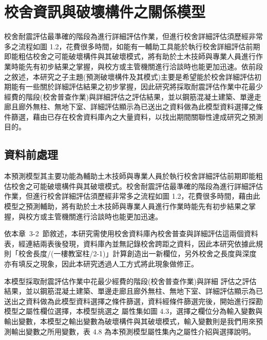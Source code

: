 \renewcommand\thetable{\arabic{chapter}-\arabic{table}}
\chapter{校舍資訊與破壞構件之關係模型}

校舍耐震評估最準確的階段為進行詳細評估作業，但進行校舍詳細評估須歷經非常多之流程如圖 1.2，花費很多時間，如能有一輔助工具能於執行校舍詳細評估前期即能粗估校舍之可能破壞構件與其破壞模式，將有助於土木技師與專業人員進行作業時能先有初步結果之掌握，與校方或主管機關進行洽談時也能更加迅速。依前段之敘述，本研究之子主題(預測破壞構件及其模式)主要是希望能於校舍詳細評估初期能有一些關於詳細評估結果之初步掌握，因此研究將採取耐震評估作業中花最少經費的階段(校舍普查作業)與詳細評估之評估結果，並以鋼筋混凝土建築、單邊走廊且廊外無柱、無地下室、詳細評估顯示為已送出之資料做為此模型資料選擇之條件篩選，藉由已存在校舍資料庫內之大量資料，以找出期間關聯性達成研究之預測目的。

\section{資料前處理}

本預測模型其主要功能為輔助土木技師與專業人員於執行校舍詳細評估前期即能粗估校舍之可能破壞構件與其破壞模式。校舍耐震評估最準確的階段為進行詳細評估作業，但進行校舍詳細評估須歷經非常多之流程如圖 1.2，花費很多時間，藉由此模型之預測輔助，將有助於土木技師與專業人員進行作業時能先有初步結果之掌握，與校方或主管機關進行洽談時也能更加迅速。

依本章~3-2~節敘述，本研究需使用校舍資料庫內校舍普查與詳細評估這兩個資料表，經連結兩表後發現，資料庫內並無記錄校舍跨距之資料，因此本研究依據此規則「校舍長度/(一樓教室柱/2-1)」計算創造出一新欄位，另外校舍之長度與深度亦有填反之現象，因此本研究透過人工方式將此現象做修正。

本模型採取耐震評估作業中花最少經費的階段(校舍普查作業)與詳細 評估之評估結果，並以鋼筋混凝土建築、單邊走廊且廊外無柱、無地下室、詳細評估顯示為已送出之資料做為此模型資料選擇之條件篩選，資料經條件篩選完後，開始進行探勘模型之屬性欄位選擇，本模型挑選之 屬性集如圖 4.3，選擇之欄位分為輸入變數與輸出變數，本模型之輸出變數為破壞構件與其破壞模式，輸入變數則是我們用來預測輸出變數之所用變數，表 4.8 為本預測模型屬性集內之屬性介紹與選擇說明。

